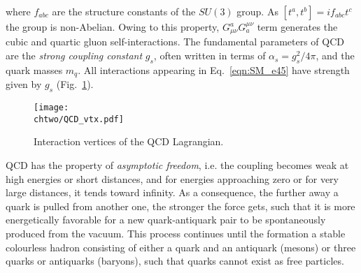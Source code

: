 \noindent where $f_{abc}$ are the structure constants of the $SU(3)$ group.
As $[t^a,t^b] = if_{abc}t^c$ the group is non-Abelian. Owing to this property, $G^a_{\mu\nu}G^{\mu\nu}_a$ term generates the cubic and quartic gluon self-interactions.
The fundamental parameters of QCD are the \textit{strong coupling constant} $g_s$, often written in terms of $\alpha_s = g_s^2/4\pi$, and the quark masses $m_q$.
All interactions appearing in Eq.~\ref{eqn:SM_e45} have strength given by $g_s$ (Fig.~\ref{fig:QCDVtx}).\\

\begin{figure}[!htb]
\centering
\texttt{[image: \\chtwo/QCD\_vtx.pdf]}
\caption{Interaction vertices of the QCD Lagrangian.}
\label{fig:QCDVtx}
\end{figure}

QCD has the property of \textit{asymptotic freedom}, i.e. the coupling becomes weak at high energies or short distances, and for energies approaching zero or for very large distances, it tends toward infinity.
As a consequence, the further away a quark is pulled from another one, the stronger the force gets, such that it is more energetically favorable for a new quark-antiquark pair to be spontaneously produced from the vacuum.
This process continues until the formation a stable colourless hadron consisting of either a quark and an antiquark (mesons) or three quarks or antiquarks (baryons), such that quarks cannot exist as free particles.

